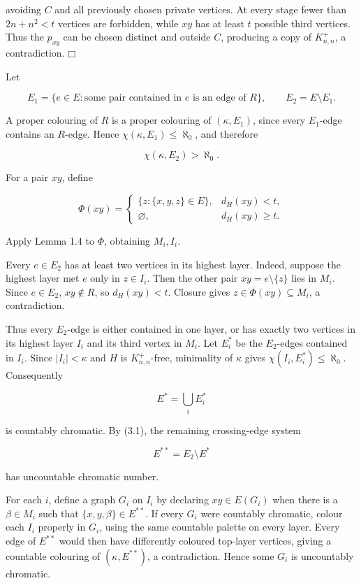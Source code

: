 \documentclass[11pt]{article}
\providecommand{\square}{\mdlgwhtsquare}
\begin{document}
avoiding \(C\) and all previously chosen private vertices. At every stage fewer than \(2n+n^2<t\) vertices are forbidden, while \(xy\) has at least \(t\) possible third vertices. Thus the \(p_{xy}\) can be chosen distinct and outside \(C\), producing a copy of \(K_{n,n}^{+}\), a contradiction. \(\square\)

Let

\[
E_1=\{e\in E:\text{some pair contained in }e\text{ is an edge of }R\},
\qquad E_2=E\setminus E_1.
\]

A proper colouring of \(R\) is a proper colouring of \((\kappa,E_1)\), since every \(E_1\)-edge contains an \(R\)-edge. Hence \(\chi(\kappa,E_1)\le\aleph_0\), and therefore

\[
\chi(\kappa,E_2)>\aleph_0. \tag{3.1}
\]

For a pair \(xy\), define

\[
\Phi(xy)=
\begin{cases}
\{z:\{x,y,z\}\in E\},&d_H(xy)<t,\\
\varnothing,&d_H(xy)\ge t.
\end{cases}
\]

Apply Lemma 1.4 to \(\Phi\), obtaining \(M_i,I_i\).

Every \(e\in E_2\) has at least two vertices in its highest layer. Indeed, suppose the highest layer met \(e\) only in \(z\in I_i\). Then the other pair \(xy=e\setminus\{z\}\) lies in \(M_i\). Since \(e\in E_2\), \(xy\notin R\), so \(d_H(xy)<t\). Closure gives \(z\in\Phi(xy)\subseteq M_i\), a contradiction.

Thus every \(E_2\)-edge is either contained in one layer, or has exactly two vertices in its highest layer \(I_i\) and its third vertex in \(M_i\). Let \(E_i^*\) be the \(E_2\)-edges contained in \(I_i\). Since \(|I_i|<\kappa\) and \(H\) is \(K_{n,n}^{+}\)-free, minimality of \(\kappa\) gives \(\chi(I_i,E_i^*)\le\aleph_0\). Consequently

\[
E^*=\bigcup_iE_i^*
\]

is countably chromatic. By (3.1), the remaining crossing-edge system

\[
E^{**}=E_2\setminus E^*
\]

has uncountable chromatic number.

For each \(i\), define a graph \(G_i\) on \(I_i\) by declaring \(xy\in E(G_i)\) when there is a \(\beta\in M_i\) such that \(\{x,y,\beta\}\in E^{**}\). If every \(G_i\) were countably chromatic, colour each \(I_i\) properly in \(G_i\), using the same countable palette on every layer. Every edge of \(E^{**}\) would then have differently coloured top-layer vertices, giving a countable colouring of \((\kappa,E^{**})\), a contradiction. Hence some \(G_i\) is uncountably chromatic.
\end{document}
